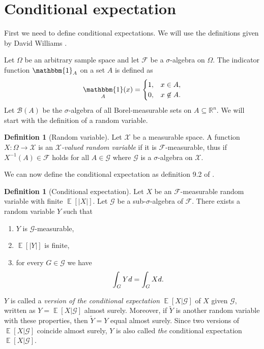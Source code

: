 \documentclass[twoside,a4paper]{report}
\theoremstyle{plain}
\theoremstyle{definition}
\newtheorem{definition}[theorem]{Definition}
\theoremstyle{remark}
\numberwithin{equation}{chapter}
\newcommand{\R}{\mathbb{R}}
\let\P\relax
\DeclareMathOperator{\P}{\mathbb{P}}
\DeclareMathOperator{\E}{\mathbb{E}}
\DeclareMathOperator{\1}{\mathbbm{1}}
\newcommand{\F}{\mathcal{F}}
\renewcommand{\G}{\mathcal{G}}
\newcommand{\B}{\mathcal{B}}
\newcommand{\X}{\mathcal{X}}
\begin{document}
\section{Conditional expectation}
First we need to define conditional expectations. We will use the definitions given by David Williams \cite{Williams91}.

Let $\Omega$ be an arbitrary sample space and let $\mathcal{F}$ be a $\sigma$-algebra on $\Omega$. The indicator function $\1_A$ on a set $A$ is defined as
\begin{equation}
\1_A(x)=\begin{cases}1,&x\in A,\\0,&x\not\in A.\end{cases}
\end{equation}
Let $\B(A)$ be the $\sigma$-algebra of all Borel-measurable sets on $A\subseteq\R^n$. We will start with the definition of a random variable.

\begin{definition}[Random variable]
Let $\X$ be a measurable space. A function $X\colon\Omega\to\X$ is an \emph{$\X$-valued random variable} if it is $\F$-measurable, thus if $X^{-1}(A)\in\F$ holds for all $A\in\G$ where $\G$ is a $\sigma$-algebra on $\X$.
\end{definition}

We can now define the conditional expectation as definition 9.2 of \cite{Williams91}.

\begin{definition}[Conditional expectation]\label{def:conexp}
Let $X$ be an $\F$-measurable random variable with finite $\E[|X|]$. Let $\G$ be a sub-$\sigma$-algebra of $\F$. There exists a random variable $Y$ such that 
\begin{enumerate}
\item $Y$ is $\G$-measurable,
\item $\E[|Y|]$ is finite,
\item for every $G\in\G$ we have 
\begin{equation}
\int_G Yd\P=\int_G Xd\P.
\end{equation}
\end{enumerate}
$Y$ is called a \emph{version of the conditional expectation} $\E[X|\G]$ of $X$ given $\G$, written as $Y=\E[X|\G]$ almost surely. Moreover, if $\tilde{Y}$ is another random variable with these properties, then $\tilde{Y}=Y$ equal almost surely. Since two versions of $\E[X|\G]$ coincide almost surely, $Y$ is also called \emph{the} conditional expectation $\E[X|\G]$.
\end{definition}
\end{document}
